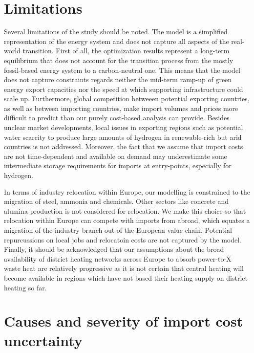 
\section*{Limitations}

Several limitations of the study should be noted. The model is a simplified
representation of the energy system and does not capture all aspects of the
real-world transition. First of all, the optimization results represent a
long-term equilibrium that does not account for the transition process from the
mostly fossil-based energy system to a carbon-neutral one. This means that the
model does not capture constraints regards neither the mid-term ramp-up of green
energy export capacities nor the speed at which supporting infrastructure could
scale up. Furthermore, global competition betweeen potential exporting
countries, as well as between importing countries, make import volumes and
prices more difficult to predict than our purely cost-based analysis can
provide. Besides unclear market developments, local issues in exporting regions
such as potential water scarcity to produce large amounts of hydrogen in
renewable-rich but arid countries is not addressed. Moreover, the fact that we
assume that import costs are not time-dependent and available on demand may
underestimate some intermediate storage requirements for imports at
entry-points, especially for hydrogen.

In terms of industry relocation within Europe, our modelling is constrained to
the migration of steel, ammonia and chemicals. Other sectors like concrete and
alumina production is not considered for relocation. We make this choice so that
relocation within Europe can compete with imports from abroad, which equates a
migration of the industry branch out of the European value chain. Potential
repurcussions on local jobs and relocatoin costs are not captured by the model.
Finally, it should be acknowledged that our assumptions about the broad
availability of district heating networks across Europe to absorb
\mbox{power-to-X} waste heat are relatively progressive as it is not certain
that central heating will become available in regions which have not based their
heating supply on district heating so far.

\newpage

\section*{Causes and severity of import cost uncertainty}

